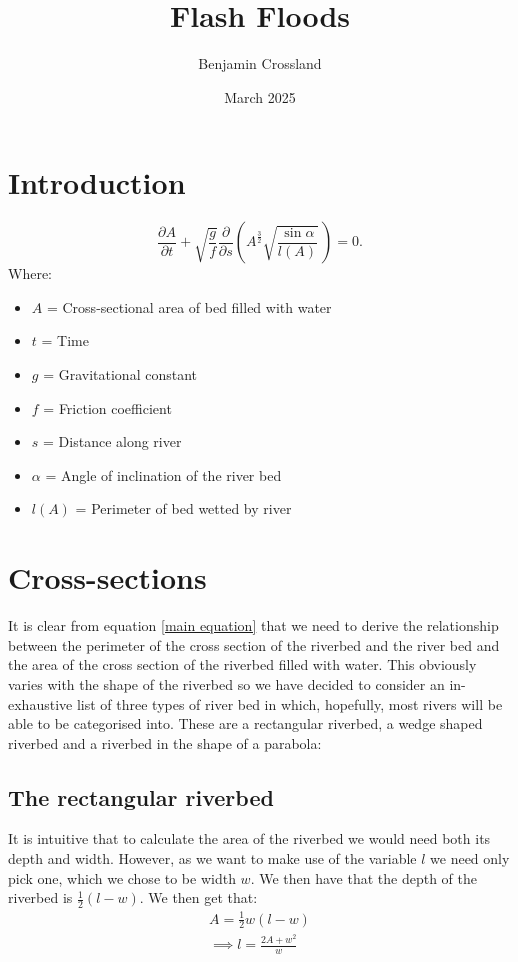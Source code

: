 \documentclass{article}
\title{Flash Floods}
\author{Benjamin Crossland}
\date{March 2025}
\begin{document}
\maketitle

\section{Introduction}
\begin{equation}
\label{main equation}
    \frac{\partial A}{\partial t} + \sqrt {\frac{g}{f}} \frac{\partial}{\partial s}\left( A^{\frac{3}{2}} \sqrt{\frac{\sin \alpha} {l(A)}} \, \right) = 0.
\end{equation}
Where:
\begin{itemize}
    \item $A$ = Cross-sectional area of bed filled with water
    \item $t$ = Time
    \item $g$ = Gravitational constant
    \item $f$ = Friction coefficient
    \item $s$ = Distance along river
    \item $\alpha$ = Angle of inclination of the river bed
    \item $l(A)$ = Perimeter of bed wetted by river
\end{itemize}

\section{Cross-sections}
It is clear from equation \ref{main equation} that we need to derive the relationship between the perimeter of the cross section of the riverbed and the river bed and the area of the cross section of the riverbed filled with water. This obviously varies with the shape of the riverbed so we have decided to consider an in-exhaustive list of three types of river bed in which, hopefully, most rivers will be able to be categorised into. These are a rectangular riverbed, a wedge shaped riverbed and a riverbed in the shape of a parabola: 

\subsection{The rectangular riverbed}

It is intuitive that to calculate the area of the riverbed we would need both its depth and width. However, as we want to make use of the variable $l$ we need only pick one, which we chose to be width $w$. We then have that the depth of the riverbed is $\frac{1}{2}(l-w)$. We then get that: 
\begin{align}
A = \frac{1}{2}w(l-w)\\
\implies l = \frac{2A+w^2}{w} \label{perimeter rectangle}
\end{align}
\end{document}
